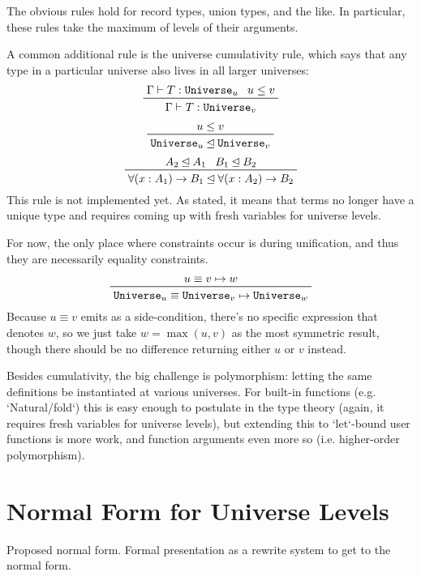 \documentclass[11pt, twoside, reqno]{book}
\newcommand{\subsumedBy}{\unlhd}
\begin{document}
The obvious rules hold for record types, union types, and the like.
In particular, these rules take the maximum of levels of their arguments.

A common additional rule is the universe cumulativity rule, which says that any type in a particular universe also lives in all larger universes:
\begin{displaymath}
\prftree{\Gamma \vdash T : \texttt{Universe}_u}{u \le v}{\Gamma \vdash T : \texttt{Universe}_v}
\end{displaymath}
\begin{displaymath}
\prftree{u \le v}{\texttt{Universe}_u \subsumedBy \texttt{Universe}_v}
\end{displaymath}
\begin{displaymath}
\prftree{A_2 \subsumedBy A_1}{B_1 \subsumedBy B_2}{\forall(x : A_1) \to B_1 \subsumedBy \forall(x : A_2) \to B_2}
\end{displaymath}
This rule is not implemented yet.
As stated, it means that terms no longer have a unique type and requires coming up with fresh variables for universe levels.

For now, the only place where constraints occur is during unification, and thus they are necessarily equality constraints.
\begin{displaymath}
\prftree{u \equiv v \mapsto w}{\texttt{Universe}_u \equiv \texttt{Universe}_v \mapsto \texttt{Universe}_w}
\end{displaymath}
Because \(u \equiv v\) emits as a side-condition, there's no specific expression that denotes \(w\), so we just take \(w = \max(u,v)\) as the most symmetric result, though there should be no difference returning either \(u\) or \(v\) instead.

Besides cumulativity, the big challenge is polymorphism: letting the same definitions be instantiated at various universes.
For built-in functions (e.g. \inHS`Natural/fold`) this is easy enough to postulate in the type theory (again, it requires fresh variables for universe levels), but extending this to \inHS`let`-bound user functions is more work, and function arguments even more so (i.e. higher-order polymorphism).

\section{Normal Form for Universe Levels}
\label{nf-uni-lvl}

Proposed normal form. Formal presentation as a rewrite system to get to the normal form.
\end{document}
